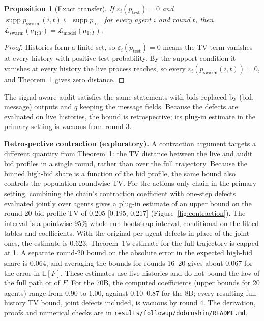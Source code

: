 \documentclass[11pt,letterpaper]{article}
\newtheorem{proposition}[theorem]{Proposition}
\begin{document}
\begin{proposition}[Exact transfer]
If $\varepsilon_i(p_{\mathrm{test}}) = 0$ and $\operatorname{supp} p_{\mathrm{swarm}}(i,t) \subseteq \operatorname{supp} p_{\mathrm{test}}$ for every agent $i$ and round $t$, then $\mathcal{L}_{\mathrm{swarm}}(a_{1:T}) = \mathcal{L}_{\mathrm{model}}(a_{1:T})$.
\end{proposition}

\begin{proof}
Histories form a finite set, so $\varepsilon_i(p_{\mathrm{test}}) = 0$ means the TV term vanishes at every history with positive test probability.
By the support condition it vanishes at every history the live process reaches, so every $\varepsilon_i(p_{\mathrm{swarm}}(i,t)) = 0$, and Theorem~1 gives zero distance.
\end{proof}

The signal-aware audit satisfies the same statements with bids replaced by (bid, message) outputs and $q$ keeping the message fields.
Because the defects are evaluated on live histories, the bound is retrospective; its plug-in estimate in the primary setting is vacuous from round 3.

\textbf{Retrospective contraction (exploratory).}
A contraction argument targets a different quantity from Theorem~1: the TV distance between the live and audit bid profiles in a single round, rather than over the full trajectory.
Because the binned high-bid share is a function of the bid profile, the same bound also controls the population roundwise TV.
For the actions-only chain in the primary setting, combining the chain's contraction coefficient with one-step defects evaluated jointly over agents gives a plug-in estimate of an upper bound on the round-20 bid-profile TV of 0.205 [0.195, 0.217] (Figure~\ref{fig:contraction}).
The interval is a pointwise 95\% whole-run bootstrap interval, conditional on the fitted tables and coefficients.
With the original per-agent defects in place of the joint ones, the estimate is 0.623; Theorem~1's estimate for the full trajectory is capped at 1.
A separate round-20 bound on the absolute error in the expected high-bid share is 0.064, and averaging the bounds for rounds 16--20 gives about 0.067 for the error in $\mathbb{E}[F]$.
These estimates use live histories and do not bound the law of the full path or of $F$.
For the 70B, the computed coefficients (upper bounds for 20 agents) range from 0.90 to 1.00, against 0.10--0.87 for the 8B; every resulting full-history TV bound, joint defects included, is vacuous by round 4.
The derivation, proofs and numerical checks are in \href{https://github.com/AbdulMusthakin/swarm-audit/blob/b52434290039a1bc775137271a38ee35c06d432c/results/followup/dobrushin/README.md}{\texttt{results/followup/dobrushin/README.md}}.
\end{document}
